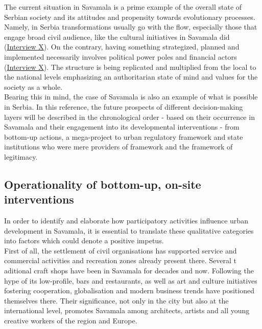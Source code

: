 \documentclass[11pt]{report}
\begin{document}
The current situation in Savamala is a prime example of the overall state of Serbian society and its attitudes and propensity towards evolutionary processes.
Namely, in Serbia transformations usually go with the flow, especially those that engage broad civil audience, like the cultural initiatives in Savamala did
(\href{InterviewX}{Interview X}).
On the contrary, having something strategized, planned and implemented necessarily involves political power poles and financial actors (\href{InterviewX}{Interview X}).
The structure is being replicated and multiplied from the local to the national levels emphasizing an authoritarian state of mind and values for the society as a whole.
\\

Bearing this in mind, the case of Savamala is also an example of what is possible in Serbia. In this reference, the future prospects of different decision-making layers will be described in the chronological order - based on their occurrence in Savamala and their engagement into its developmental interventions - from bottom-up actions, a mega-project to urban regulatory framework and state institutions who were mere providers of framework and the framework of legitimacy. 

\subsection{Operationality of bottom-up, on-site interventions}

In order to identify and elaborate how participatory activities influence urban development in Savamala, it is essential to translate these qualitative categories into factors which could denote a positive impetus.
\\

First of all, the settlement of civil organisations has supported service and commercial activities and recreation zones already present there. Several t
aditional craft shops have been in Savamala for decades and now. Following the hype of its low-profile, bars and restaurants, as well as art and culture initiatives fostering cooperation, globalisation and modern business trends have positioned themselves there.
Their significance, not only in the city but also at the international level, promotes Savamala among architects, artists and all young creative workers of the region and Europe.
\\
\end{document}
